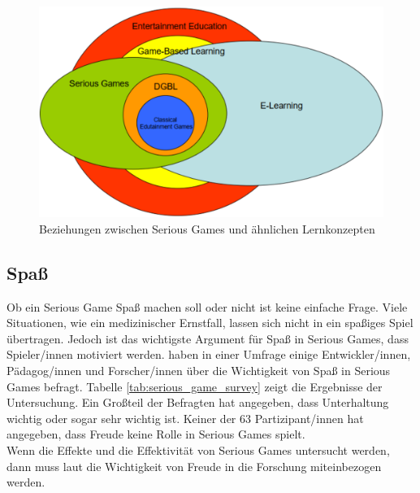 \begin{figure}[h]
    \centering
	\includegraphics[width=1\linewidth]{figures/serious_games/serious_game_cat}
	\caption{Beziehungen zwischen Serious Games und ähnlichen Lernkonzepten \cite{breuer_bente:2010:why_so_serious}}
	\label{fig:serious_games_relations}
\end{figure}


\subsection{Spaß}
Ob ein Serious Game Spaß machen soll oder nicht ist keine einfache Frage. Viele Situationen, wie ein medizinischer Ernstfall, lassen sich nicht in ein spaßiges Spiel übertragen. Jedoch ist das wichtigste Argument für Spaß in Serious Games, dass Spieler/innen motiviert werden. \citeauthor{michael:2006:educate} haben in einer Umfrage einige Entwickler/innen, Pädagog/innen und Forscher/innen über die Wichtigkeit von Spaß in Serious Games befragt. Tabelle \ref{tab:serious_game_survey} zeigt die Ergebnisse der Untersuchung. Ein Großteil der Befragten hat angegeben, dass Unterhaltung wichtig oder sogar sehr wichtig ist. Keiner der 63 Partizipant/innen hat angegeben, dass Freude keine Rolle in Serious Games spielt. \cite{michael:2006:educate} \\
Wenn die Effekte und die Effektivität von Serious Games untersucht werden, dann muss laut \citeauthor{breuer_bente:2010:why_so_serious} die Wichtigkeit von Freude in die Forschung miteinbezogen werden. \cite{breuer_bente:2010:why_so_serious}

